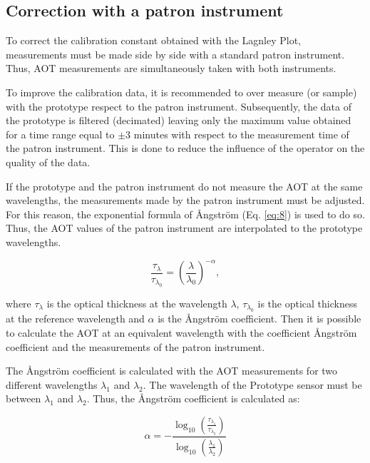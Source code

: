 \documentclass[12pt,letterpaper]{article}
\numberwithin{figure}{section}
\numberwithin{equation}{section}
\numberwithin{table}{section}
\begin{document}
\subsection{Correction with a patron instrument}

To correct the calibration constant obtained with the Lagnley Plot, measurements must be made side by side with a standard patron instrument.  Thus, AOT measurements are simultaneously taken with both instruments. 

To improve the calibration data, it is recommended to over measure (or sample) with the prototype respect to the patron instrument. Subsequently, the data of the prototype is filtered (decimated) leaving only the maximum value obtained for a time range equal to $\pm 3$ minutes with respect to the measurement time of the patron instrument. This is done to reduce the influence of the operator on the quality of the data.

If the prototype and the patron instrument do not measure the AOT at the same wavelengths, the measurements made by the patron instrument must be adjusted.  For this reason, the exponential formula of {\AA}ngstr\"{o}m (Eq. \ref{eq:8}) is used to do so. Thus, the AOT values of the patron instrument are interpolated to the prototype wavelengths.

\begin{equation}
    \frac{\tau_{\lambda}}{\tau_{\lambda_0}} = \left(\frac{\lambda}{\lambda_0}\right)^{-\alpha}, 
    \label{eq:8}
\end{equation}


where $\tau_{\lambda}$ is the optical thickness at the wavelength $\lambda$, $\tau_{\lambda_0}$ is the optical thickness at the reference wavelength and $\alpha$ is the {\AA}ngstr\"{o}m coefficient. Then it is possible to calculate the AOT at an equivalent wavelength with the coefficient {\AA}ngstr\"{o}m coefficient and the measurements of the patron instrument.

The {\AA}ngstr\"{o}m coefficient is calculated with the AOT measurements for two different wavelengths $\lambda_1$ and $\lambda_2$.  The wavelength of the Prototype sensor must be between $\lambda_1$ and $\lambda_2$.  Thus, the {\AA}ngstr\"{o}m coefficient is calculated as:

\begin{equation}
    \alpha=-\frac{\log_{10} \left(\frac{\tau_{\lambda_1}}{\tau_{\lambda_2}}\right)}{\log_{10} \left(\frac{\lambda_1}{\lambda_2}\right)}   
    \label{eq:9}
\end{equation}
\end{document}
